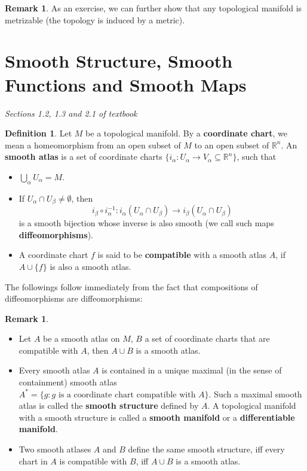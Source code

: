\documentclass{article}
\theoremstyle{definition}
\newtheorem{dfn}[thm]{Definition}
\newtheorem{rmk}[thm]{Remark}
\begin{document}
\begin{rmk}
    As an exercise, we can further show that any topological manifold is metrizable (the topology is induced by a metric).
\end{rmk}

\newpage

\section{Smooth Structure, Smooth Functions and Smooth Maps}

{\em Sections 1.2, 1.3 and 2.1 of textbook}\\

\begin{dfn}
    Let $M$ be a topological manifold. By a {\bf coordinate chart}, we mean a homeomorphism from an open subset of $M$ to an open subset of $\mathbb{R}^n$. An {\bf smooth atlas} is a set of coordinate charts $\{i_\alpha: U_\alpha\rightarrow V_\alpha\subseteq \mathbb{R}^n\}$, such that
    \begin{itemize}
        \item $\bigcup_\alpha U_\alpha=M$.
        \item If $U_\alpha\cap U_\beta\not=\emptyset$, then 
        \[i_\beta\circ i_\alpha^{-1}: i_\alpha(U_\alpha\cap U_\beta)\rightarrow i_\beta(U_\alpha\cap U_\beta)\]
        is a smooth bijection whose inverse is also smooth (we call such maps {\bf diffeomorphisms}).
        \item A coordinate chart $f$ is said to be {\bf compatible} with a smooth atlas $A$, if $A\cup\{f\}$ is also a smooth atlas.
    \end{itemize}
\end{dfn}

The followings follow immediately from the fact that compositions of diffeomorphisms are diffeomorphisms:

\begin{rmk}
    \begin{itemize}
        \item Let $A$ be a smooth atlas on $M$, $B$ a set of coordinate charts that are compatible with $A$, then $A\cup B$ is a smooth atlas.
        \item Every smooth atlas $A$ is contained in a unique maximal (in the sense of containment) smooth atlas $A^*=\{g: g\text{ is a coordinate chart compatible with }A\}$. Such a maximal smooth atlas is called the {\bf smooth structure} defined by $A$. A topological manifold with a smooth structure is called a {\bf smooth manifold} or a {\bf differentiable manifold}.
        \item Two smooth atlases $A$ and $B$ define the same smooth structure, iff every chart in $A$ is compatible with $B$, iff $A\cup B$ is a smooth atlas.
    \end{itemize}    
\end{rmk}
\end{document}
